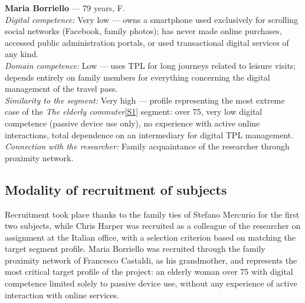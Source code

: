 ﻿\documentclass[11pt,a4paper]{article}
\begin{document}
\begin{tcolorbox}[base]
\vspace{0.2cm}

\textbf{Maria Borriello} --- 79 years, F.\\[0.3cm]
\textit{Digital competence:} Very low --- owns a
smartphone used exclusively for scrolling
social networks (Facebook, family photos); has never
made online purchases, accessed public
administration portals, or used transactional digital
services of any kind.\\[0.2cm]
\textit{Domain competence:} Low --- uses TPL
for long journeys related to leisure visits; depends entirely on family members for everything
concerning the digital management of the travel pass.\\[0.2cm]
\textit{Similarity to the segment:} Very high --- profile
representing the most extreme case of the
\textit{The elderly commuter}\hyperref[seg:anziana]{[S1]} segment: over 75, very low digital competence
(passive device use only), no
experience with active online interactions, total dependence
on an intermediary for digital TPL management.\\[0.2cm]
\textit{Connection with the researcher:} Family acquaintance
of the researcher through proximity network.

\end{tcolorbox}

\vspace{0.2cm}
\subsection*{Modality of recruitment of subjects}
\label{sec:recruitment-modality-client}
\begin{tcolorbox}[base]
Recruitment took place thanks to the family ties of Stefano Mercurio for the first two subjects, while Chris Harper was recruited as a colleague of the researcher on assignment at the Italian office, with a selection criterion based on matching the target segment profile. Maria Borriello was recruited through the family proximity network of Francesco Castaldi, as his grandmother, and represents the most critical target profile of the project: an elderly woman over 75 with digital competence limited solely to passive device use, without any experience of active interaction with online services.
\end{tcolorbox}
\vspace{0.2cm}
\end{document}
